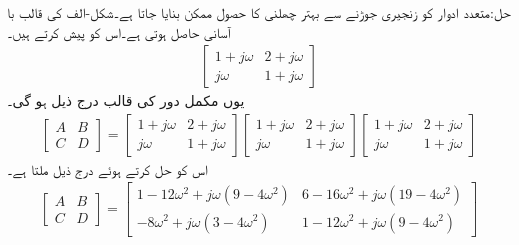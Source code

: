 حل:متعدد  ادوار کو زنجیری جوڑنے سے بہتر چھلنی کا حصول ممکن بنایا جاتا ہے۔شکل-الف کی قالب با آسانی حاصل ہوتی ہے۔اس کو پیش کرتے ہیں۔
\begin{align*}
\begin{bmatrix}
1+j\omega& 2+j\omega\\
j\omega&1+j\omega
\end{bmatrix}
\end{align*}
یوں مکمل دور کی قالب درج ذیل ہو گی۔
\begin{align*}
\begin{bmatrix}
A& B\\
C&D
\end{bmatrix}
=
\begin{bmatrix}
1+j\omega& 2+j\omega\\
j\omega&1+j\omega
\end{bmatrix}
\begin{bmatrix}
1+j\omega& 2+j\omega\\
j\omega&1+j\omega
\end{bmatrix}
\begin{bmatrix}
1+j\omega& 2+j\omega\\
j\omega&1+j\omega
\end{bmatrix}
\end{align*}
اس کو حل کرتے ہوئے درج ذیل ملتا ہے۔
\begin{align*}
\begin{bmatrix}
A& B\\
C&D
\end{bmatrix}
=
\begin{bmatrix}
1-12\omega^2+j\omega(9-4\omega^2) & 6-16\omega^2+j\omega(19-4\omega^2)\\
-8\omega^2+j\omega(3-4\omega^2)&1-12\omega^2+j\omega(9-4\omega^2)
\end{bmatrix}
\end{align*}
